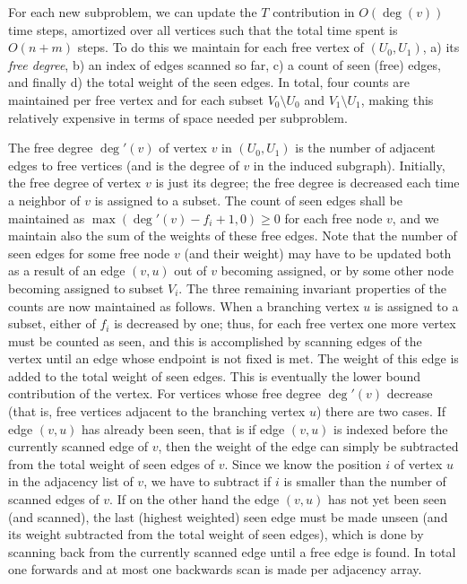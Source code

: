 \documentclass[a4paper,11pt]{article}
\begin{document}
For each new subproblem, we can update the $T$ contribution in
$O(\deg(v))$ time steps, amortized over all vertices such that the
total time spent is $O(n+m)$ steps. To do this we maintain for each
free vertex of $(U_0,U_1)$, a) its \emph{free degree}, b) an index of
edges scanned so far, c) a count of seen (free) edges, and finally d)
the total weight of the seen edges. In total, four counts are
maintained per free vertex and for each subset $V_0\setminus U_0$ and
$V_1\setminus U_1$, making this relatively expensive in terms of space
needed per subproblem.

The free degree $\deg'(v)$ of vertex $v$ in $(U_0,U_1)$ is the number
of adjacent edges to free vertices (and is the degree of $v$ in the
induced subgraph). Initially, the free degree of vertex $v$ is just
its degree; the free degree is decreased each time a neighbor of $v$
is assigned to a subset. The count of seen edges shall be maintained
as $\max(\deg'(v)-f_i+1,0)\geq 0$ for each free node $v$, and we
maintain also the sum of the weights of these free edges. Note that
the number of seen edges for some free node $v$ (and their weight) may
have to be updated both as a result of an edge $(v,u)$ out of $v$
becoming assigned, or by some other node becoming assigned to subset
$V_i$. The three remaining invariant properties of the counts are now
maintained as follows. When a branching vertex $u$ is assigned to a
subset, either of $f_i$ is decreased by one; thus, for each free
vertex one more vertex must be counted as seen, and this is
accomplished by scanning edges of the vertex until an edge whose
endpoint is not fixed is met. The weight of this edge is added to the
total weight of seen edges. This is eventually the lower bound
contribution of the vertex. For vertices whose free degree $\deg'(v)$
decrease (that is, free vertices adjacent to the branching vertex $u$)
there are two cases. If edge $(v,u)$ has already been seen, that is if
edge $(v,u)$ is indexed before the currently scanned edge of $v$, then
the weight of the edge can simply be subtracted from the total weight
of seen edges of $v$.  Since we know the position $i$ of vertex $u$ in
the adjacency list of $v$, we have to subtract if $i$ is smaller than
the number of scanned edges of $v$. If on the other hand the edge
$(v,u)$ has not yet been seen (and scanned), the last (highest
weighted) seen edge must be made unseen (and its weight subtracted
from the total weight of seen edges), which is done by scanning back
from the currently scanned edge until a free edge is found. In total
one forwards and at most one backwards scan is made per adjacency array.
\end{document}
